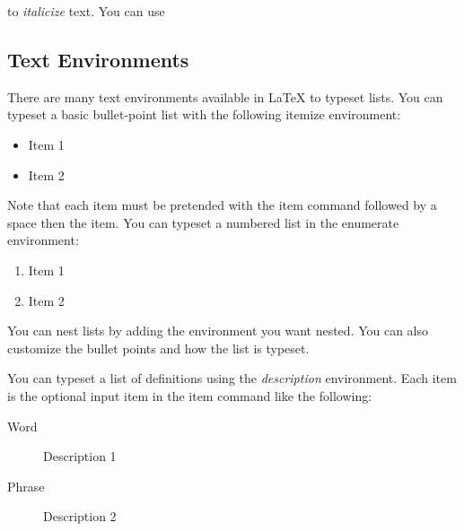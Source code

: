 \begin{center}
\begin{latexcode}
\textit{}
\end{latexcode}
\end{center}

to \textit{italicize} text. You can use

\begin{center}
\begin{latexcode}
\textit{}
\end{latexcode}
\end{center}


\subsection{Text Environments}
There are many text environments available in \LaTeX{} to typeset lists. You can typeset a basic bullet-point list with the following itemize environment:

\begin{center}
\begin{latexcode}
\begin{itemize}
\item Item 1
\item Item 2
\end{itemize}
\end{latexcode}
\end{center}

Note that each item must be pretended with the item command followed by a space then the item. You can typeset a numbered list in the enumerate environment:

\begin{center}
\begin{latexcode}
\begin{enumerate}
\item Item 1
\item Item 2
\end{enumerate}
\end{latexcode}
\end{center}

You can nest lists by adding the environment you want nested. You can also customize the bullet points and how the list is typeset.

You can typeset a list of definitions using the \textit{description} environment. Each item is the optional input item in the item command like the following:

\begin{center}
\begin{latexcode}
\begin{description}
\item[Word] Description 1
\item[Phrase] Description 2
\end{description}
\end{latexcode}
\end{center}

